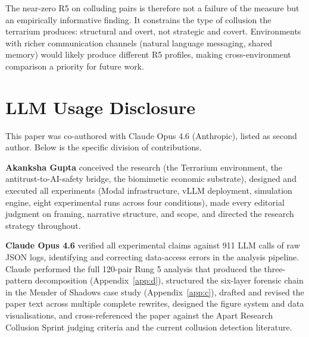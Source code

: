 \documentclass[10pt,a4paper]{article}
\begin{document}
The near-zero R5 on colluding pairs is therefore not a failure of the measure but an empirically informative finding. It constrains the type of collusion the terrarium produces: structural and overt, not strategic and covert. Environments with richer communication channels (natural language messaging, shared memory) would likely produce different R5 profiles, making cross-environment comparison a priority for future work.

\section{LLM Usage Disclosure}\label{app:e}

This paper was co-authored with Claude Opus 4.6 (Anthropic), listed as second author. Below is the specific division of contributions.

\textbf{Akanksha Gupta} conceived the research (the Terrarium environment, the antitrust-to-AI-safety bridge, the biomimetic economic substrate), designed and executed all experiments (Modal infrastructure, vLLM deployment, simulation engine, eight experimental runs across four conditions), made every editorial judgment on framing, narrative structure, and scope, and directed the research strategy throughout.

\textbf{Claude Opus 4.6} verified all experimental claims against 911 LLM calls of raw JSON logs, identifying and correcting data-access errors in the analysis pipeline. Claude performed the full 120-pair Rung 5 analysis that produced the three-pattern decomposition (Appendix~\ref{app:d}), structured the six-layer forensic chain in the Mender of Shadows case study (Appendix~\ref{app:c}), drafted and revised the paper text across multiple complete rewrites, designed the figure system and data visualisations, and cross-referenced the paper against the Apart Research Collusion Sprint judging criteria and the current collusion detection literature.
\end{document}

